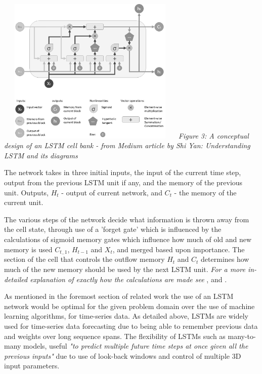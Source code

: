 \documentclass[oneside, 12pt]{article}
\begin{document}
			\begin{center}
				\includegraphics[width=9cm,height=7cm]{images/lstm.png}
				\newline
				\textit{Figure 3: A conceptual design of an LSTM cell bank - from Medium article by Shi Yan: Understanding LSTM and its diagrams}\cite{23}
			\end{center}
			
			The network takes in three initial inputs, the input of the current time step, output from the previous LSTM unit if any, and the memory of the previous unit. Outputs, $H_t$ - output of current network, and $C_t$ - the memory of the current unit. \cite{23}
			
			The various steps of the network decide what information is thrown away from the cell state, through use of a 'forget gate' which is influenced by the calculations of sigmoid memory gates which influence how much of old and new memory is used $C_{t_-1}$, $H_{t-1}$
			and $X_t$, and merged based upon importance. The section of the cell that controls the outflow memory $H_t$ and $C_t$ determines how much of the new memory should be used by the next LSTM unit. 
			\textit{For a more in-detailed explanation of exactly how the calculations are made see} \cite{22},\cite{23} and \cite{24}.
			
			As mentioned in the foremost section of related work the use of an LSTM network would be optimal for the given problem domain over the use of machine learning algorithms, for time-series data. As detailed above, LSTMs are widely used for time-series data forecasting due to being able to remember previous data and weights over long sequence spans\cite{22}\cite{25}. The flexibility of LSTMs such as many-to-many models, useful \textit{"to predict multiple future time steps at once given all the previous inputs"} due to use of look-back windows and control of multiple 3D input parameters.\cite{25}
			
\end{document}
